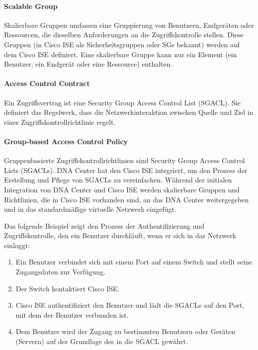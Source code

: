 \paragraph{Scalable Group}
Skalierbare Gruppen umfassen eine Gruppierung von Benutzern, Endgeräten oder Ressourcen, die dieselben Anforderungen an die Zugriffskontrolle stellen. Diese Gruppen (in Cisco ISE als Sicherheitsgruppen oder SGs bekannt) werden auf dem Cisco ISE definiert. Eine skalierbare Gruppe kann nur ein Element (ein Benutzer, ein Endgerät oder eine Ressource) enthalten.

\paragraph{Access Control Contract}
Ein Zugriffsvertrag ist eine Security Group Access Control List (SGACL). Sie definiert das Regelwerk, dass die Netzwerkinteraktion zwischen Quelle und Ziel in einer Zugriffskontrollrichtlinie regelt.

\paragraph{Group-based Access Control Policy}
Gruppenbasierte Zugriffskontrollrichtlinien sind Security Group Access Control Lists (SGACLs). DNA Center hat den Cisco ISE integriert, um den Prozess der Erstellung und Pflege von SGACLs zu vereinfachen. Während der initialen Integration von DNA Center und Cisco ISE werden skalierbare Gruppen und Richtlinien, die in Cisco ISE vorhanden sind, an das DNA Center weitergegeben und in das standardmäßige virtuelle Netzwerk eingefügt.

Das folgende Beispiel zeigt den Prozess der Authentifizierung und Zugriffskontrolle, den ein Benutzer durchläuft, wenn er sich in das Netzwerk einloggt:
\begin{enumerate}
	\item Ein Benutzer verbindet sich mit einem Port auf einem Switch und stellt seine Zugangsdaten zur Verfügung.
	\item Der Switch kontaktiert Cisco ISE.
	\item Cisco ISE authentifiziert den Benutzer und lädt die SGACLs auf den Port, mit dem der Benutzer verbunden ist.
	\item  Dem Benutzer wird der Zugang zu bestimmten Benutzern oder Geräten (Servern) auf der Grundlage des in die SGACL gewährt.
\end{enumerate}





